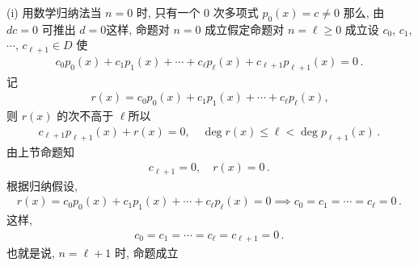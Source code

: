 \begin{pf}
    (i) 用数学归纳法\period 当 $n=0$ 时, 只有一个 $0$ 次多项式 $p_0 (x) = c \neq 0$ 那么, 由 $dc = 0$ 可推出 $d = 0$\period 这样, 命题对 $n=0$ 成立\period 假定命题对 $n = \ell \geq 0$ 成立\period 设 $c_0$, $c_1$, $\cdots$, $c_{\ell + 1} \in D$ 使
    \begin{align*}
        c_0 p_0 (x) + c_1 p_1 (x) + \cdots + c_{\ell} p_{\ell} (x) + c_{\ell + 1} p_{\ell + 1} (x) = 0 \period
    \end{align*}
    记
    \begin{align*}
        r(x) = c_0 p_0 (x) + c_1 p_1 (x) + \cdots + c_{\ell} p_{\ell} (x),
    \end{align*}
    则 $r(x)$ 的次不高于 $\ell$\period 所以
    \begin{align*}
        c_{\ell + 1} p_{\ell + 1} (x) + r(x) = 0, \quad \deg r(x) \leq \ell < \deg p_{\ell + 1} (x) \period
    \end{align*}
    由上节命题知
    \begin{align*}
        c_{\ell + 1} = 0, \quad r(x) = 0 \period
    \end{align*}
    根据归纳假设,
    \begin{align*}
        r(x) = c_0 p_0 (x) + c_1 p_1 (x) + \cdots + c_{\ell} p_{\ell} (x) = 0 \implies c_0 = c_1 = \cdots = c_{\ell} = 0 \period
    \end{align*}
    这样,
    \begin{align*}
        c_0 = c_1 = \cdots = c_{\ell} = c_{\ell + 1} = 0 \period
    \end{align*}
    也就是说, $n=\ell + 1$ 时, 命题成立\period


\end{pf}
